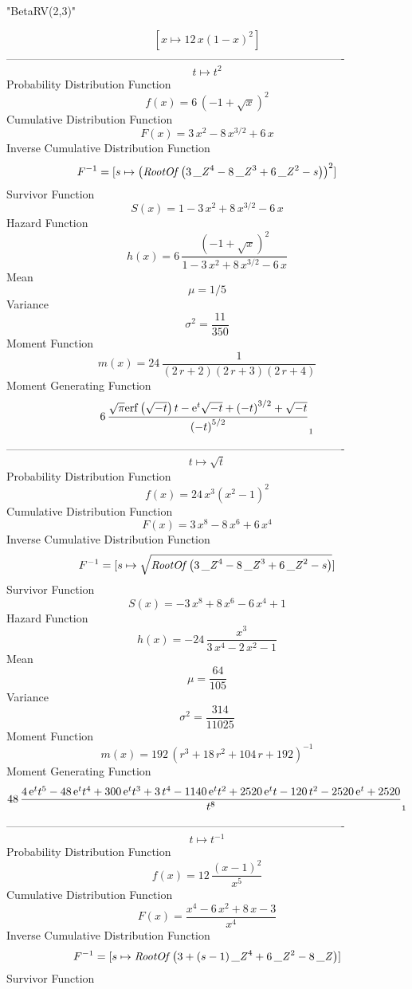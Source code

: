 \documentclass[12pt]{article}
\begin{document}
 
                                "BetaRV(2,3)"

$$[x\mapsto 12\,x \left( 1-x \right) ^{2}]
$$-------------------------------------------------------------------------------------------  \\$$t\mapsto {t}^{2}
$$Probability Distribution Function 
$$  f(x)=6\, \left( -1+\sqrt {x} \right) ^{2}
$$Cumulative Distribution Function  
 $$F(x)=3\,{x}^{2}-8\,{x}^{3/2}+6\,x
$$ Inverse Cumulative Distribution Function 
  $$F^{-1} = [s\mapsto  \left( {\it RootOf} \left( 3\,{{\it \_Z}}^{4}-8\,{{\it \_Z}
}^{3}+6\,{{\it \_Z}}^{2}-s \right)  \right) ^{2}]
$$Survivor Function 
 $$ S(x)=1-3\,{x}^{2}+8\,{x}^{3/2}-6\,x
$$ Hazard Function 
 $$ h(x)=6\,{\frac { \left( -1+\sqrt {x} \right) ^{2}}{1-3\,{x}^{2}+8\,{x}^{3/2
}-6\,x}}
$$Mean 
 $$ \mu=1/5
$$ Variance 
 $$ \sigma^2 = {\frac{11}{350}}
$$Moment Function 
 $$ m(x) = 24\,{\frac {1}{ \left( 2\,r+2 \right)  \left( 2\,r+3 \right)  \left( 2
\,r+4 \right) }}
$$ Moment Generating Function 
 $$6\,{\frac {\sqrt {\pi}{\rm erf} \left(\sqrt {-t}\right)t-{{\rm e}^{t}}
\sqrt {-t}+ \left( -t \right) ^{3/2}+\sqrt {-t}}{ \left( -t \right) ^{
5/2}}}_{{1}}
$$-------------------------------------------------------------------------------------------  \\$$t\mapsto \sqrt {t}
$$Probability Distribution Function 
$$  f(x)=24\,{x}^{3} \left( {x}^{2}-1 \right) ^{2}
$$Cumulative Distribution Function  
 $$F(x)=3\,{x}^{8}-8\,{x}^{6}+6\,{x}^{4}
$$ Inverse Cumulative Distribution Function 
  $$F^{-1} = [s\mapsto \sqrt {{\it RootOf} \left( 3\,{{\it \_Z}}^{4}-8\,{{\it \_Z}}
^{3}+6\,{{\it \_Z}}^{2}-s \right) }]
$$Survivor Function 
 $$ S(x)=-3\,{x}^{8}+8\,{x}^{6}-6\,{x}^{4}+1
$$ Hazard Function 
 $$ h(x)=-24\,{\frac {{x}^{3}}{3\,{x}^{4}-2\,{x}^{2}-1}}
$$Mean 
 $$ \mu={\frac{64}{105}}
$$ Variance 
 $$ \sigma^2 = {\frac{314}{11025}}
$$Moment Function 
 $$ m(x) = 192\, \left( {r}^{3}+18\,{r}^{2}+104\,r+192 \right) ^{-1}
$$ Moment Generating Function 
 $$48\,{\frac {4\,{{\rm e}^{t}}{t}^{5}-48\,{{\rm e}^{t}}{t}^{4}+300\,{
{\rm e}^{t}}{t}^{3}+3\,{t}^{4}-1140\,{{\rm e}^{t}}{t}^{2}+2520\,{
{\rm e}^{t}}t-120\,{t}^{2}-2520\,{{\rm e}^{t}}+2520}{{t}^{8}}}_{{1}}
$$-------------------------------------------------------------------------------------------  \\$$t\mapsto {t}^{-1}
$$Probability Distribution Function 
$$  f(x)=12\,{\frac { \left( x-1 \right) ^{2}}{{x}^{5}}}
$$Cumulative Distribution Function  
 $$F(x)={\frac {{x}^{4}-6\,{x}^{2}+8\,x-3}{{x}^{4}}}
$$ Inverse Cumulative Distribution Function 
  $$F^{-1} = [s\mapsto {\it RootOf} \left( 3+ \left( s-1 \right) {{\it \_Z}}^{4}+6
\,{{\it \_Z}}^{2}-8\,{\it \_Z} \right) ]
$$Survivor Function 
\end{document}
